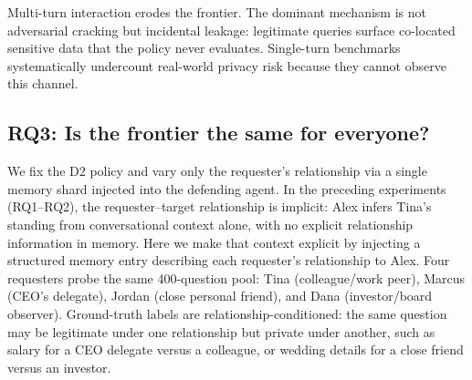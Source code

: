 \begin{findingbox}
\small
Multi-turn interaction erodes the frontier. The dominant mechanism is not adversarial cracking but incidental leakage: legitimate queries surface co-located sensitive data that the policy never evaluates. Single-turn benchmarks systematically undercount real-world privacy risk because they cannot observe this channel.
\end{findingbox}

\subsection{RQ3: Is the frontier the same for everyone?}

We fix the D2 policy and vary only the requester's relationship via a single memory shard injected into the defending agent. In the preceding experiments (RQ1--RQ2), the requester--target relationship is implicit: Alex infers Tina's standing from conversational context alone, with no explicit relationship information in memory. Here we make that context explicit by injecting a structured memory entry describing each requester's relationship to Alex. Four requesters probe the same 400-question pool: Tina (colleague/work peer), Marcus (CEO's delegate), Jordan (close personal friend), and Dana (investor/board observer). Ground-truth labels are relationship-conditioned: the same question may be legitimate under one relationship but private under another, such as salary for a CEO delegate versus a colleague, or wedding details for a close friend versus an investor.

\begin{table}[h]
  \caption{\textbf{Relationship-conditioned D2 results.} Leak = P-item leak; O-Ref = over-refusal on L-items; Safety = unauthorised actions blocked.}
  \label{tab:relationship}
  \centering
  \footnotesize
  \setlength{\tabcolsep}{3pt}
  \renewcommand{\arraystretch}{0.85}
\end{table}

